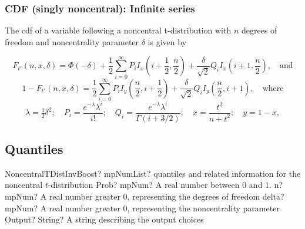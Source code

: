 \label{NoncentraltDistributionCDFBoost}



\subsubsection{CDF (singly noncentral): Infinite series}
The cdf of a variable following a noncentral  t-distribution with $n$ degrees of freedom and noncentrality parameter $\delta$ is given by \citep{Benton_2003, boost_math}

\begin{equation}
	F_{t'}\left(n,x, \delta\right) = \Phi(-\delta) + \frac{1}{2} \sum_{i=0}^{\infty} P_i I_x\left(i+ \frac{1}{2} , \frac{n}{2}\right) + \frac{\delta}{\sqrt{2}} Q_i I_x\left(i+1, \frac{n}{2}\right), \quad \text{and}
\end{equation} 
\begin{equation}
	1-F_{t'}\left(n,x, \delta\right) = \frac{1}{2} \sum_{i=0}^{\infty} P_i I_y\left( \frac{n}{2}, i+ \frac{1}{2} \right) + \frac{\delta}{\sqrt{2}} Q_i I_y\left(\frac{n}{2},i+1\right), \quad \text{where}
\end{equation}
\begin{equation}\label{eq:NonCentralTSeriesCoeff}
	\lambda = \tfrac{1}{2}\delta^2; \quad P_i =  \frac{e^{-\lambda} \lambda^i}{i!} ; \quad Q_i = \frac{e^{-\lambda} \lambda^i}{\Gamma(i+3/2)};  \quad x=\frac{t^2}{n+t^2};  \quad y=1-x,
\end{equation}




\subsection{Quantiles}
\label{NoncentralTQuantileBoost}


\begin{mpFunctionsExtract}
	\mpFunctionFour
	{NoncentralTDistInvBoost? mpNumList? quantiles and related information for the  noncentral $t$-distribution}
	{Prob? mpNum? A real number between 0 and 1.}
	{n? mpNum? A real number greater 0, representing the degrees of freedom}
	{delta? mpNum? A real number greater 0, representing the noncentrality parameter}
	{Output? String? A string describing the output choices}
\end{mpFunctionsExtract}

